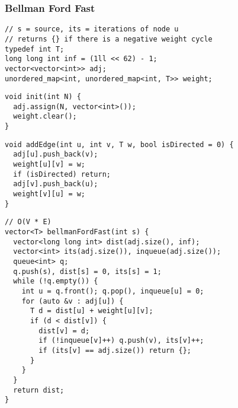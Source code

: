 \documentclass[twoside]{article}
\begin{document}
\begin{multicols*}{2}
\subsubsection*{Bellman Ford Fast}
\begin{verbatim}
// s = source, its = iterations of node u
// returns {} if there is a negative weight cycle
typedef int T;
long long int inf = (1ll << 62) - 1;
vector<vector<int>> adj;
unordered_map<int, unordered_map<int, T>> weight;
\end{verbatim}
\vspace{-12pt}
\begin{verbatim}
void init(int N) {
  adj.assign(N, vector<int>());
  weight.clear();
}
\end{verbatim}
\vspace{-12pt}
\begin{verbatim}
void addEdge(int u, int v, T w, bool isDirected = 0) {
  adj[u].push_back(v);
  weight[u][v] = w;
  if (isDirected) return;
  adj[v].push_back(u);
  weight[v][u] = w;
}
\end{verbatim}
\vspace{-12pt}
\begin{verbatim}
// O(V * E)
vector<T> bellmanFordFast(int s) {
  vector<long long int> dist(adj.size(), inf);
  vector<int> its(adj.size()), inqueue(adj.size());
  queue<int> q;
  q.push(s), dist[s] = 0, its[s] = 1;
  while (!q.empty()) {
    int u = q.front(); q.pop(), inqueue[u] = 0;
    for (auto &v : adj[u]) {
      T d = dist[u] + weight[u][v];
      if (d < dist[v]) {
        dist[v] = d;
        if (!inqueue[v]++) q.push(v), its[v]++;
        if (its[v] == adj.size()) return {};
      }
    }
  }
  return dist;
}
\end{verbatim}

\subsubsectionfont{\large\bfseries\sffamily\underline}

\end{multicols*}
\end{document}
